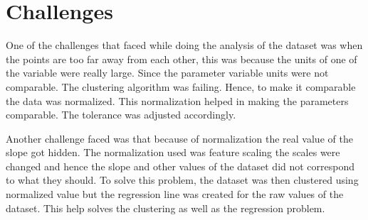 \section{Challenges}

One of the challenges that faced while doing the analysis of the dataset was when the points are too far away from each other, this was because the units of one of the variable were really large. Since the parameter variable units were not comparable. The clustering algorithm was failing. Hence, to make it comparable the data was normalized. This normalization helped in making the parameters comparable. The tolerance was adjusted accordingly.

Another challenge faced was that because of normalization the real value of the slope got hidden. The normalization used was feature scaling the scales were changed and hence the slope and other values of the dataset did not correspond to what they should. To solve this problem, the dataset was then clustered using normalized value but the regression line was created for the raw values of the dataset. This help solves the clustering as well as the regression problem.
